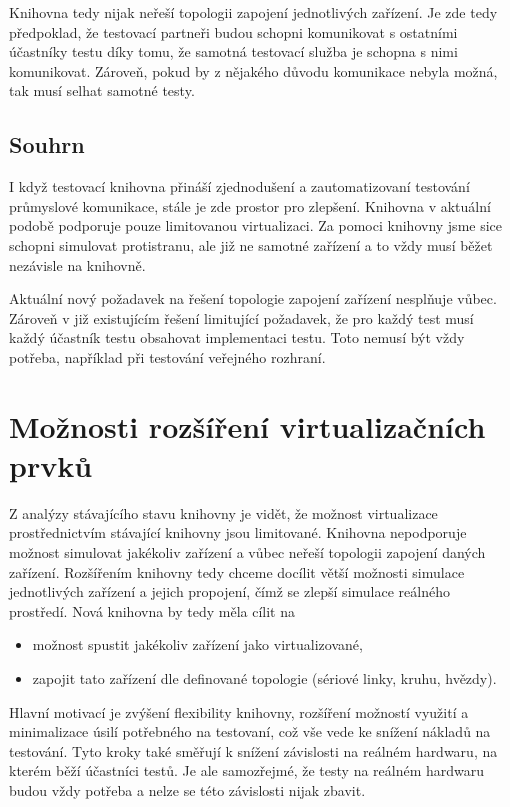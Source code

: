 Knihovna tedy nijak neřeší topologii zapojení jednotlivých zařízení. Je zde tedy předpoklad, že testovací partneři budou schopni komunikovat s ostatními účastníky testu díky tomu, že samotná testovací služba je schopna s nimi komunikovat. Zároveň, pokud by z nějakého důvodu komunikace nebyla možná, tak musí selhat samotné testy.

\subsection{Souhrn}

I když testovací knihovna přináší zjednodušení a zautomatizovaní testování průmyslové komunikace, stále je zde prostor pro zlepšení. Knihovna v aktuální podobě podporuje pouze limitovanou virtualizaci. Za pomoci knihovny jsme sice schopni simulovat protistranu, ale již ne samotné zařízení a to vždy musí běžet nezávisle na knihovně. 

Aktuální nový požadavek na řešení topologie zapojení zařízení nesplňuje vůbec. Zároveň v již existujícím řešení limitující požadavek, že pro každý test musí každý účastník testu obsahovat implementaci testu. Toto nemusí být vždy potřeba, například při testování veřejného rozhraní. 

\section{Možnosti rozšíření virtualizačních prvků}

Z analýzy stávajícího stavu knihovny je vidět, že možnost virtualizace prostřednictvím stávající knihovny jsou limitované. Knihovna nepodporuje možnost simulovat jakékoliv zařízení a vůbec neřeší topologii zapojení daných zařízení. Rozšířením knihovny tedy chceme docílit větší možnosti simulace jednotlivých zařízení a jejich propojení, čímž se zlepší simulace reálného prostředí. Nová knihovna by tedy měla cílit na

\begin{itemize}
    \item možnost spustit jakékoliv zařízení jako virtualizované,
    \item zapojit tato zařízení dle definované topologie (sériové linky, kruhu, hvězdy).
\end{itemize}

Hlavní motivací je zvýšení flexibility knihovny, rozšíření možností využití a minimalizace úsilí potřebného na testovaní, což vše vede ke snížení nákladů na testování. Tyto kroky také směřují k snížení závislosti na reálném hardwaru, na kterém běží účastníci testů. Je ale samozřejmé, že testy na reálném hardwaru budou vždy potřeba a nelze se této závislosti nijak zbavit.

